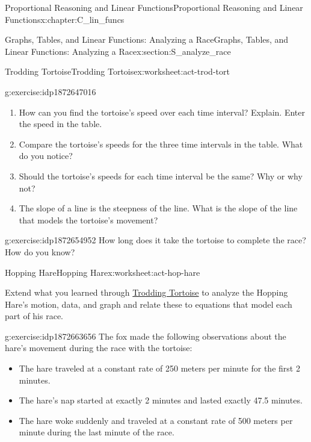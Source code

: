 \documentclass[oneside,10pt,]{book}
\numberwithin{equation}{chapter}
\begin{document}
\begin{chapterptx}{Proportional Reasoning and Linear Functions}{}{Proportional Reasoning and Linear Functions}{}{}{x:chapter:C_lin_funcs}
\begin{sectionptx}{Graphs, Tables, and Linear Functions: Analyzing a Race}{}{Graphs, Tables, and Linear Functions: Analyzing a Race}{}{}{x:section:S_analyze_race}
\begin{worksheet-subsection}{Trodding Tortoise}{}{Trodding Tortoise}{}{}{x:worksheet:act-trod-tort}
\begin{divisionexercise}{4}{}{}{g:exercise:idp1872647016}
\begin{enumerate}[font=\bfseries,label=(\alph*),ref=\alph*]
\begin{tableptx}{\textbf{The Tortoise's Travels Over Time}}{x:table:tbl-tort-travels}{}
{}%
\end{tableptx}%
\item{}How can you find the tortoise's speed over each time interval? Explain. Enter the speed in the table.%
\item{}Compare the tortoise's speeds for the three time intervals in the table. What do you notice?%
\item{}Should the tortoise's speeds for each time interval be the same? Why or why not?%
\item\label{x:task:exer-slope-def}The slope of a line is the steepness of the line. What is the slope of the line that models the tortoise's movement?%
\end{enumerate}
\end{divisionexercise}%
\begin{divisionexercise}{5}{}{}{g:exercise:idp1872654952}%
How long does it take the tortoise to complete the race? How do you know?%
\end{divisionexercise}%
\end{worksheet-subsection}
\restoregeometry
%
%
\typeout{************************************************}
\typeout{************************************************}
%
\begin{worksheet-subsection}{Hopping Hare}{}{Hopping Hare}{}{}{x:worksheet:act-hop-hare}
\begin{introduction}{}%
Extend what you learned through \hyperref[x:worksheet:act-trod-tort]{Trodding Tortoise} to analyze the Hopping Hare's motion, data, and graph and relate these to equations that model each part of his race.%
\end{introduction}%
\begin{divisionexercise}{1}{}{}{g:exercise:idp1872663656}%
The fox made the following observations about the hare's movement during the race with the tortoise:%
\begin{itemize}[label=\textbullet]
\item{}The hare traveled at a constant rate of 250 meters per minute for the first 2 minutes.%
\item{}The hare's nap started at exactly 2 minutes and lasted exactly 47.5 minutes.%
\item{}The hare woke suddenly and traveled at a constant rate of 500 meters per minute during the last minute of the race.%
\end{itemize}
%
\begin{enumerate}[font=\bfseries,label=(\alph*),ref=\alph*]

\end{enumerate}
\end{divisionexercise}
\end{worksheet-subsection}
\end{sectionptx}
\end{chapterptx}
\end{document}
